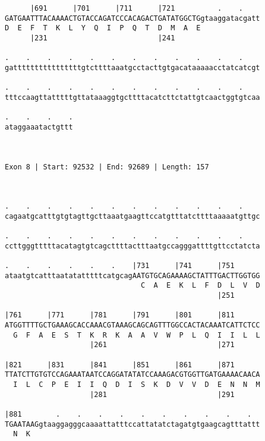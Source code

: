 \documentclass{article}
\begin{document}
\begin{Verbatim}
      |691      |701      |711      |721          .    .    
GATGAATTTACAAAACTGTACCAGATCCCACAGACTGATATGGCTGgtaaggatacgatt
D  E  F  T  K  L  Y  Q  I  P  Q  T  D  M  A  E              
      |231                          |241                    
  
.    .    .    .    .    .    .    .    .    .    .    .    
gattttttttttttttttgtcttttaaatgcctacttgtgacataaaaacctatcatcgt
                                                            
.    .    .    .    .    .    .    .    .    .    .    .    
tttccaagttatttttgttataaaggtgcttttacatcttctattgtcaactggtgtcaa
                                                            
.    .    .    .
ataggaaatactgttt
                
                
 
Exon 8 | Start: 92532 | End: 92689 | Length: 157



.    .    .    .    .    .    .    .    .    .    .    .    
cagaatgcatttgtgtagttgcttaaatgaagttccatgtttatcttttaaaaatgttgc
                                                            
.    .    .    .    .    .    .    .    .    .    .    .    
ccttgggtttttacatagtgtcagcttttactttaatgccagggattttgttcctatcta
                                                            
.    .    .    .    .    .    |731      |741      |751      
ataatgtcatttaatatatttttcatgcagAATGTGCAGAAAAGCTATTTGACTTGGTGG
                                C  A  E  K  L  F  D  L  V  D
                                                  |251      
  
|761      |771      |781      |791      |801      |811      
ATGGTTTTGCTGAAAGCACCAAACGTAAAGCAGCAGTTTGGCCACTACAAATCATTCTCC
  G  F  A  E  S  T  K  R  K  A  A  V  W  P  L  Q  I  I  L  L
                    |261                          |271      
  
|821      |831      |841      |851      |861      |871      
TTATCTTGTGTCCAGAAATAATCCAGGATATATCCAAAGACGTGGTTGATGAAAACAACA
  I  L  C  P  E  I  I  Q  D  I  S  K  D  V  V  D  E  N  N  M
                    |281                          |291      
  
|881        .    .    .    .    .    .    .    .    .    .  
TGAATAAGgtaaggagggcaaaattatttccattatatctagatgtgaagcagtttattt
  N  K                                                      
                                                            

\end{Verbatim}
\end{document}
